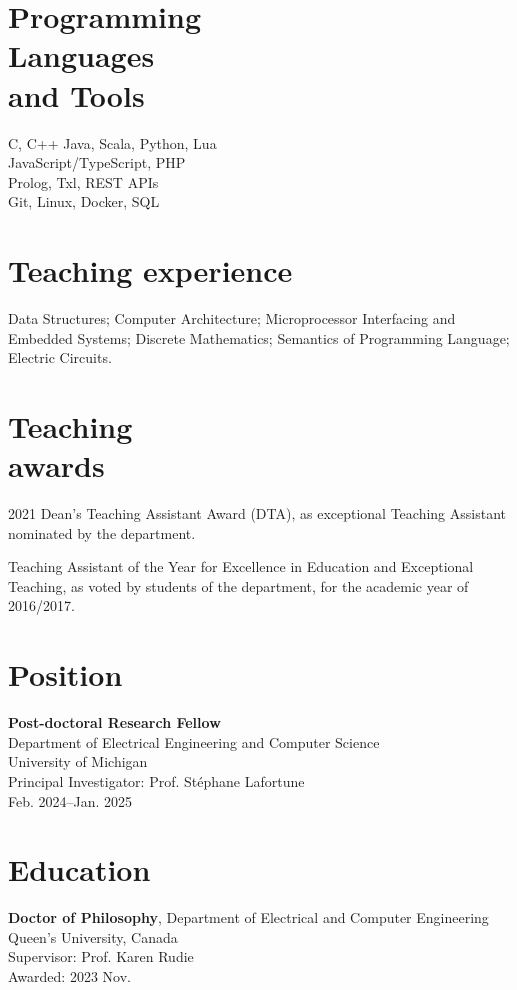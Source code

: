 \documentclass[margin]{res}
\begin{document}
\begin{resume}
\section{Programming\\Languages\\and Tools}
C, C++ Java, Scala, Python, Lua\\
JavaScript/TypeScript, PHP\\
Prolog, Txl, REST APIs\\
Git, Linux, Docker, SQL

\section{Teaching experience}
Data Structures;
Computer Architecture;
Microprocessor Interfacing and Embedded Systems;
Discrete Mathematics;
Semantics of Programming Language;
Electric Circuits.

\section{Teaching\\awards}
2021 Dean's Teaching Assistant Award (DTA), as exceptional Teaching Assistant nominated by the department.

Teaching Assistant of the Year for Excellence in Education and Exceptional Teaching, as voted by students of the department, for the academic year of 2016/2017.

\section{Position}

\textbf{Post-doctoral Research Fellow}\\
Department of Electrical Engineering and Computer Science\\
University of Michigan\\
Principal Investigator: Prof. Stéphane Lafortune\\
\null\qquad Feb. 2024--Jan. 2025


\section{Education}
\textbf{Doctor of Philosophy},
Department of Electrical and Computer Engineering\\
Queen's University, Canada\\
\null\qquad Supervisor: Prof. Karen Rudie\\
\null\qquad Awarded: 2023 Nov.


\end{resume}
\end{document}
